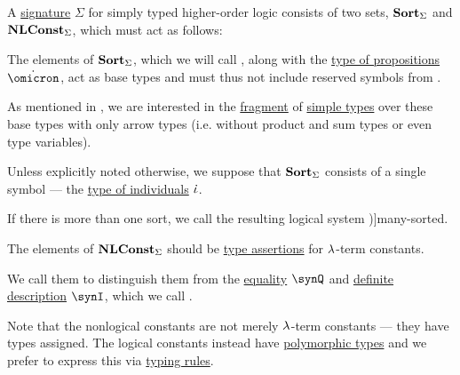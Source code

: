 \begin{definition}\label{def:simply_typed_hol_signature}\mimprovised
  A \hyperref[con:reserved_symbol]{signature} \( \Sigma \) for simply typed higher-order logic consists of two  sets, \( \op*{Sort}_\Sigma \) and \( \op*{NLConst}_\Sigma \), which must act as follows:
  \begin{thmenum}
     The elements of \( \op*{Sort}_\Sigma \), which we will call , along with the \hyperref[def:simply_typed_hol_alphabet/types/omicron]{type of propositions} \( \syn\omicron \), act as base types and must thus not include reserved symbols from .

    As mentioned in , we are interested in the \hyperref[con:syntax_fragment]{fragment} of \hyperref[def:simple_type]{simple types} over these base types with only arrow types (i.e. without product and sum types or even type variables).

    Unless explicitly noted otherwise, we suppose that \( \op*{Sort}_\Sigma \) consists of a single symbol --- the \hyperref[def:simply_typed_hol_alphabet/types/propositions]{type of individuals} \( \dot{\iota} \).

    If there is more than one sort, we call the resulting logical system \term[en=many-sorted predicate logic (\cite[\S 4.4.13]{TroelstraSchwichtenberg2000BasicProofTheory})]{many-sorted}.

     The elements of \( \op*{NLConst}_\Sigma \) should be \hyperref[def:type_assertion]{type assertions} for  \( {\mathrm \lambda} \)-term constants.

    We call them  to distinguish them from the \hyperref[def:simply_typed_hol_alphabet/const/equality]{equality} \( \synQ \) and \hyperref[def:simply_typed_hol_alphabet/const/description]{definite description} \( \synI \), which we call .

    Note that the nonlogical constants are not merely \( {\mathrm \lambda} \)-term constants --- they have types assigned. The logical constants instead have \hyperref[def:polymorphic_typed_lambda_calculus]{polymorphic types} and we prefer to express this via \hyperref[def:simple_type_rule]{typing rules}.
  \end{thmenum}
\end{definition}
